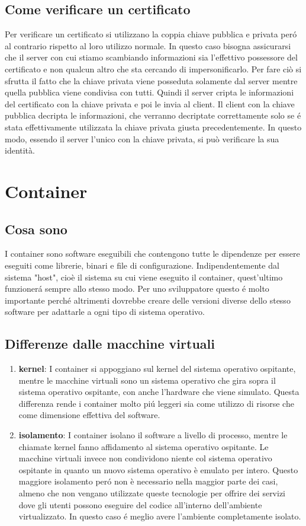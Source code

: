 \subsection{Come verificare un certificato}
Per verificare un certificato si utilizzano la coppia chiave pubblica e privata peró al contrario rispetto al loro utilizzo normale. In questo caso bisogna assicurarsi che il server con cui stiamo scambiando informazioni sia l'effettivo possessore del certificato e non qualcun altro che sta cercando di impersonificarlo. Per fare ciò si sfrutta il fatto che la chiave privata viene posseduta solamente dal server mentre quella pubblica viene condivisa con tutti. Quindi il server cripta le informazioni del certificato con la chiave privata e poi le invia al client. Il client con la chiave pubblica decripta le informazioni, che verranno decriptate correttamente solo se é stata effettivamente utilizzata la chiave privata giusta precedentemente. In questo modo, essendo il server l'unico con la chiave privata, si può verificare la sua identità.

\section{Container}
\subsection{Cosa sono}
\cite{container}I container sono software eseguibili che contengono tutte le dipendenze per essere eseguiti come librerie, binari e file di configurazione. Indipendentemente dal sistema "host", cioè il sistema su cui viene eseguito il container, quest'ultimo funzionerá sempre allo stesso modo. Per uno sviluppatore questo é molto importante perché altrimenti dovrebbe creare delle versioni diverse dello stesso software per adattarle a ogni tipo di sistema operativo.
\subsection{Differenze dalle macchine virtuali}
\begin{enumerate}
  \item \textbf{kernel}: I container si appoggiano sul kernel del sistema operativo ospitante, mentre le macchine virtuali sono un sistema operativo che gira sopra il sistema operativo ospitante, con anche l'hardware che viene simulato. Questa differenza rende i container molto piú leggeri sia come utilizzo di risorse che come dimensione effettiva del software.
  \item \textbf{isolamento}: I container isolano il software a livello di processo, mentre le chiamate kernel fanno affidamento al sistema operativo ospitante. Le macchine virtuali invece non condividono niente col sistema operativo ospitante in quanto un nuovo sistema operativo è emulato per intero. Questo maggiore isolamento peró non è necessario nella maggior parte dei casi, almeno che non vengano utilizzate queste tecnologie per offrire dei servizi dove gli utenti possono eseguire del codice all'interno dell'ambiente virtualizzato. In questo caso é meglio avere l'ambiente completamente isolato.
\end{enumerate}

